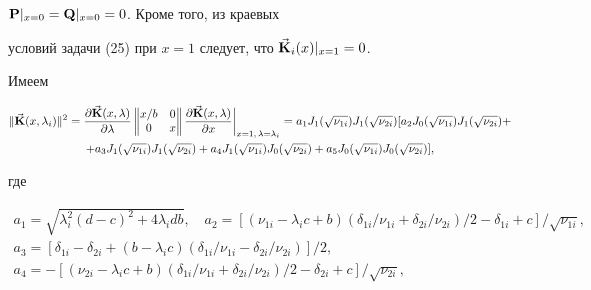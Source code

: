 \begin{exam}
$\bold P|_{x=0}=\bold Q|_{x=0}=0$. Кроме того, из краевых 


условий задачи (25) при $x=1$ следует, что $\Vec{\bold{K}}_i(x)|_{x=1}=0$. 


Имеем 


\begin{multline} 


\|\vb{K}(x,\lambda_i)\|^2= 


\frac{\partial\vb{K}(x,\lambda)}{\partial\lambda} 


\begin{Vmatrix} 


x/b & 0 \\ 0 & x 


\end{Vmatrix} 


\frac{\partial\vb{K}(x,\lambda)}{\partial x} 


\bigg|_{x=1,\,\lambda=\lambda_i}=a_1J_1 


(\sqrt{\nu_{1i}})J_1(\sqrt{\nu_{2i}}) 


[a_2J_0(\sqrt{\nu_{1i}})J_1(\sqrt{\nu_{2i}})+ \\ 


% 


+a_3J_1(\sqrt{\nu_{1i}})J_1(\sqrt{\nu_{2i}})+ 


a_4J_1(\sqrt{\nu_{1i}})J_0(\sqrt{\nu_{2i}})+ 


a_5J_0(\sqrt{\nu_{1i}})J_0(\sqrt{\nu_{2i}})], 


\end{multline} 


где 


\begin{gather*} 


a_1=\sqrt{\lambda^2_i(d-c)^2+4\lambda_i d b},\quad 


a_2=[(\nu_{1i}-\lambda_i c+b)(\delta_{1i}/\nu_{1i}+ 


\delta_{2i}/\nu_{2i})/2-\delta_{1i}+c]/\sqrt{\nu_{1i}},\\ 


% 


a_3=[\delta_{1i}-\delta_{2i}+(b-\lambda_i c)(\delta_{1i} 


/\nu_{1i}-\delta_{2i}/\nu_{2i})]/2,\\


%


a_4=-[(\nu_{2i}-\lambda_i c+b) 


(\delta_{1i}/\nu_{1i}+\delta_{2i}/\nu_{2i}) 


/2-\delta_{2i}+c]/\sqrt{\nu_{2i}},\\ 



\end{gather*}
\end{exam}
